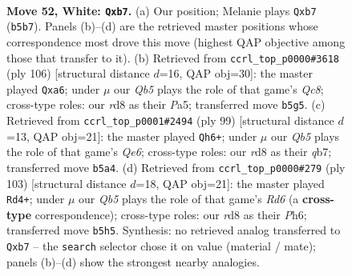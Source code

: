 \documentclass[11pt]{article}
\begin{document}
\clearpage

\begin{figure}[p]\centering
\begin{subfigure}{0.46\textwidth}\centering
\resizebox{\linewidth}{!}{%
\newchessgame
\chessboard[
  setfen={3r4/1p6/4k3/1Q6/4P3/8/6PP/1K6 w - - 3 52},
  showmover=false,
  pgfstyle=straightmove, color=movearrow, markmove={b5-b7}
]}
\caption{}
\end{subfigure}\hfill
\begin{subfigure}{0.46\textwidth}\centering
\resizebox{\linewidth}{!}{%
\newchessgame
\chessboard[
  setfen={2Q5/4k3/p5p1/P7/1P1q4/7K/8/8 w - - 3 54},
  showmover=false,
  pgfstyle=straightmove, color=movearrow, markmove={c8-a6}
]}
\caption{}
\end{subfigure}
\\[4pt]
\begin{subfigure}{0.46\textwidth}\centering
\resizebox{\linewidth}{!}{%
\newchessgame
\chessboard[
  setfen={8/1Q6/4k3/8/6p1/4q1P1/P6K/8 b - - 0 50},
  showmover=false,
  pgfstyle=straightmove, color=movearrow, markmove={e3-h6}
]}
\caption{}
\end{subfigure}\hfill
\begin{subfigure}{0.46\textwidth}\centering
\resizebox{\linewidth}{!}{%
\newchessgame
\chessboard[
  setfen={3k4/P7/4p1pp/8/1K6/3r1P2/8/8 b - - 19 52},
  showmover=false,
  pgfstyle=straightmove, color=movearrow, markmove={d3-d4}
]}
\caption{}
\end{subfigure}
\caption{\textbf{Move 52, White: \texttt{Qxb7}.} (a) Our position; Melanie plays \texttt{Qxb7} (\texttt{b5b7}). Panels (b)--(d) are the retrieved master positions whose correspondence most drove this move (highest QAP objective among those that transfer to it). (b) Retrieved from \texttt{ccrl\_top\_p0000\#3618} (ply 106) [structural distance $d$=16, QAP obj=30]: the master played \texttt{Qxa6}; under $\mu$ our \emph{Qb5} plays the role of that game's \emph{Qc8}; cross-type roles: our \emph{r}d8 as their \emph{P}a5; transferred move \texttt{b5g5}. (c) Retrieved from \texttt{ccrl\_top\_p0001\#2494} (ply 99) [structural distance $d$=13, QAP obj=21]: the master played \texttt{Qh6+}; under $\mu$ our \emph{Qb5} plays the role of that game's \emph{Qe6}; cross-type roles: our \emph{r}d8 as their \emph{q}b7; transferred move \texttt{b5a4}. (d) Retrieved from \texttt{ccrl\_top\_p0000\#279} (ply 103) [structural distance $d$=18, QAP obj=21]: the master played \texttt{Rd4+}; under $\mu$ our \emph{Qb5} plays the role of that game's \emph{Rd6} (a \textbf{cross-type} correspondence); cross-type roles: our \emph{r}d8 as their \emph{P}h6; transferred move \texttt{b5h5}. Synthesis: no retrieved analog transferred to \texttt{Qxb7} -- the \texttt{search} selector chose it on value (material / mate); panels (b)--(d) show the strongest nearby analogies.}
\label{fig:thought-m102}
\end{figure}
\end{document}
